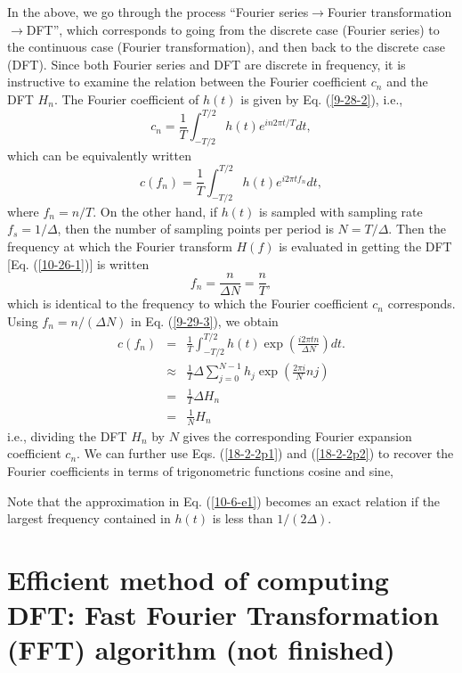 \documentclass{article}
\begin{document}
In the above, we go through the process ``Fourier series$\rightarrow$Fourier
transformation $\rightarrow$DFT'', which corresponds to going from the
discrete case (Fourier series) to the continuous case (Fourier
transformation), and then back to the discrete case (DFT). Since both Fourier
series and DFT are discrete in frequency, it is instructive to examine the
relation between the Fourier coefficient $c_n$ and the DFT $H_n$. The Fourier
coefficient of $h (t)$ is given by Eq. (\ref{9-28-2}), i.e.,
\begin{equation}
  c_n = \frac{1}{T} \int_{- T / 2}^{T / 2} h (t) e^{i n 2 \pi t / T} d t,
\end{equation}
which can be equivalently written
\begin{equation}
  \label{9-29-3} c (f_n) = \frac{1}{T} \int_{- T / 2}^{T / 2} h (t) e^{i 2 \pi
  t f_n} d t,
\end{equation}
where $f_n = n / T$. On the other hand, if $h (t)$ is sampled with sampling
rate $f_s = 1 / \Delta$, then the number of sampling points per period is $N =
T / \Delta$. Then the frequency at which the Fourier transform $H (f)$ is
evaluated in getting the DFT [Eq. (\ref{10-26-1})] is written
\begin{equation}
  f_n = \frac{n}{\Delta N} = \frac{n}{T},
\end{equation}
which is identical to the frequency to which the Fourier coefficient $c_n$
corresponds. Using $f_n = n / (\Delta N)$ in Eq. (\ref{9-29-3}), we obtain
\begin{eqnarray}
  c (f_n) & = & \frac{1}{T} \int_{- T / 2}^{T / 2} h (t) \exp \left( \frac{i 2
  \pi t n}{\Delta N} \right) d t. \nonumber\\
  & \approx & \frac{1}{T} \Delta \sum_{j = 0}^{N - 1} h_j \exp \left( \frac{2
  \pi i}{N} n j \right)  \label{10-6-e1}\\
  & = & \frac{1}{T} \Delta H_n \nonumber\\
  & = & \frac{1}{N} H_n 
\end{eqnarray}
i.e., dividing the DFT $H_n$ by $N$ gives the corresponding Fourier expansion
coefficient $c_n$. We can further use Eqs. (\ref{18-2-2p1}) and
(\ref{18-2-2p2}) to recover the Fourier coefficients in terms of trigonometric
functions cosine and sine,

Note that the approximation in Eq. (\ref{10-6-e1}) becomes an exact relation
if the largest frequency contained in $h (t)$ is less than $1 / (2 \Delta)$.

\appendix\section{Efficient method of computing DFT: Fast Fourier
Transformation (FFT) algorithm (not
finished)}\label{23-3-23-p1}\label{18-1-28-a1}
\end{document}
